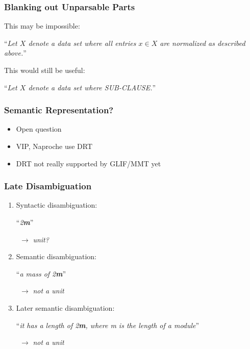 \documentclass{beamer}
\newcommand\str[1]{{\color{black!50!green}``\textit{#1}''}}
\begin{document}
\begin{frame}
    \frametitle{Blanking out Unparsable Parts}

    This may be impossible:

    \str{Let $X$ denote a data set where all entries $x \in X$ are normalized as described above.}

    \vspace{1em}
    This would still be useful:

    \str{Let $X$ denote a data set where {\upshape\ttfamily SUB-CLAUSE}.}
\end{frame}

\begin{frame}
    \frametitle{Semantic Representation?}

    \begin{itemize}
        \item Open question
        \item VIP, Naproche use DRT
        \item DRT not really supported by GLIF/MMT yet
    \end{itemize}
    
    \vspace{2em}
    \resizebox{\textwidth}{!}{
        
    }
\end{frame}

\begin{frame}
    \frametitle{Late Disambiguation}

    \begin{enumerate}
        \item Syntactic disambiguation:\\
            \vspace{0.3em}
            \begin{minipage}{0.5\textwidth}
                \str{2\textbf{m}}
            \end{minipage}
            $\,\;\rightarrow$ \textit{unit?}
        \item Semantic disambiguation:\\
            \vspace{0.3em}
            \begin{minipage}{0.5\textwidth}
                \str{a mass of 2\textbf{m}}
            \end{minipage}
            $\,\;\rightarrow$ \textit{not a unit}
        \item Later semantic disambiguation:\\
            \vspace{0.3em}
            \begin{minipage}{0.5\textwidth}
                \str{it has a length of 2\textbf{m}, where m is the length of a module}
            \end{minipage}
            $\,\;\rightarrow$ \textit{not a unit}
    \end{enumerate}
\end{frame}
\end{document}
